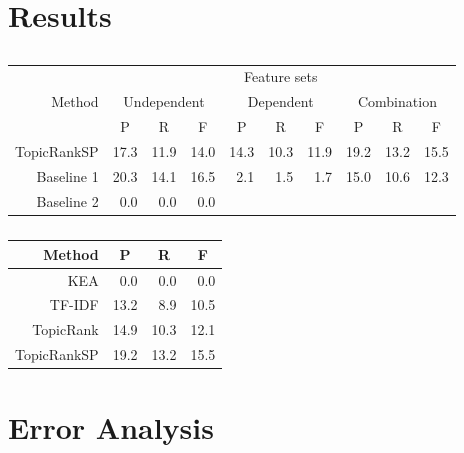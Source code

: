 \section{Results}
\label{sec:results}
  \begin{table*}
    \centering
    \begin{tabular}{rrrrrrrrrr}
      \toprule
      & \multicolumn{9}{c}{Feature sets}\\
      \cmidrule{2-10}
      Method & \multicolumn{3}{c}{Undependent} & \multicolumn{3}{c}{Dependent} & \multicolumn{3}{c}{Combination}\\
      \cmidrule(r){2-4}
      \cmidrule{5-7}
      \cmidrule(l){8-10}
      & \multicolumn{1}{c}{P} & \multicolumn{1}{c}{R} & \multicolumn{1}{c}{F} & \multicolumn{1}{c}{P} & \multicolumn{1}{c}{R} & \multicolumn{1}{c}{F} & \multicolumn{1}{c}{P} & \multicolumn{1}{c}{R} & \multicolumn{1}{c}{F}\\
      \midrule
      TopicRankSP & 17.3 & 11.9 & 14.0
                  & 14.3 & 10.3 & 11.9
                  & 19.2 & 13.2 & 15.5\\
      Baseline 1  & 20.3 & 14.1 & 16.5
                  & 2.1 & 1.5 & 1.7
                  & 15.0 & 10.6 & 12.3\\
      Baseline 2  & 0.0 & 0.0 & 0.0
                  &  &  & 
                  &  &  & \\
      \bottomrule
    \end{tabular}
    \caption{
             \label{tab:baseline_comparison}}
  \end{table*}

  \begin{table}[h]
    \centering
    \begin{tabular}{rrrr}
      \toprule
      Method & \multicolumn{1}{c}{P} & \multicolumn{1}{c}{R} & \multicolumn{1}{c}{F}\\
      \midrule
      KEA         & 0.0 & 0.0 & 0.0\\
      TF-IDF      & 13.2 & 8.9 & 10.5\\
      TopicRank   & 14.9 & 10.3 & 12.1\\
      TopicRankSP & 19.2 & 13.2 & 15.5\\
      \bottomrule
    \end{tabular}
    \caption{
             \label{tab:state_of_the_art_comparison}}
  \end{table}

\section{Error Analysis}
\label{sec:error_analysis}

